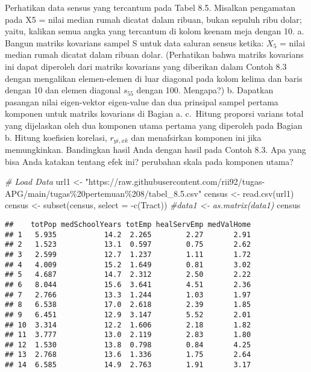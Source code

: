 \documentclass[
]{article}
\newenvironment{Shaded}{\begin{snugshade}}{\end{snugshade}}
\newcommand{\AttributeTok}[1]{\textcolor[rgb]{0.77,0.63,0.00}{#1}}
\newcommand{\CommentTok}[1]{\textcolor[rgb]{0.56,0.35,0.01}{\textit{#1}}}
\newcommand{\FunctionTok}[1]{\textcolor[rgb]{0.00,0.00,0.00}{#1}}
\newcommand{\NormalTok}[1]{#1}
\newcommand{\OtherTok}[1]{\textcolor[rgb]{0.56,0.35,0.01}{#1}}
\newcommand{\SpecialCharTok}[1]{\textcolor[rgb]{0.00,0.00,0.00}{#1}}
\newcommand{\StringTok}[1]{\textcolor[rgb]{0.31,0.60,0.02}{#1}}
\begin{document}
Perhatikan data sensus yang tercantum pada Tabel 8.5. Misalkan
pengamatan pada X5 = nilai median rumah dicatat dalam ribuan, bukan
sepuluh ribu dolar; yaitu, kalikan semua angka yang tercantum di kolom
keenam meja dengan 10. a. Bangun matriks kovarians sampel S untuk data
saluran sensus ketika: \(X_{5}\) = nilai median rumah dicatat dalam
ribuan dolar. (Perhatikan bahwa matriks kovarians ini dapat diperoleh
dari matriks kovarians yang diberikan dalam Contoh 8.3 dengan mengalikan
elemen-elemen di luar diagonal pada kolom kelima dan baris dengan 10 dan
elemen diagonal \(s_{55}\) dengan 100. Mengapa?) b. Dapatkan pasangan
nilai eigen-vektor eigen-value dan dua prinsipal sampel pertama komponen
untuk matriks kovarians di Bagian a. c.~Hitung proporsi varians total
yang dijelaskan oleh dua komponen utama pertama yang diperoleh pada
Bagian b. Hitung koefisien korelasi, \(r_{yi, xk}\) dan menafsirkan
komponen ini jika memungkinkan. Bandingkan hasil Anda dengan hasil pada
Contoh 8.3. Apa yang bisa Anda katakan tentang efek ini? perubahan skala
pada komponen utama?

\begin{Shaded}
\begin{Highlighting}[]
\CommentTok{\# Load Data}
\NormalTok{url1 }\OtherTok{\textless{}{-}} \StringTok{"https://raw.githubusercontent.com/rii92/tugas{-}APG/main/tugas\%20pertemuan\%208/tabel\_8.5.csv"}
\NormalTok{census }\OtherTok{\textless{}{-}} \FunctionTok{read.csv}\NormalTok{(url1)}
\NormalTok{census }\OtherTok{\textless{}{-}} \FunctionTok{subset}\NormalTok{(census, }\AttributeTok{select =} \SpecialCharTok{{-}}\FunctionTok{c}\NormalTok{(Tract))}
\CommentTok{\#data1 \textless{}{-} as.matrix(data1)}
\NormalTok{census}
\end{Highlighting}
\end{Shaded}

\begin{verbatim}
##    totPop medSchoolYears totEmp healServEmp medValHome
## 1   5.935           14.2  2.265        2.27       2.91
## 2   1.523           13.1  0.597        0.75       2.62
## 3   2.599           12.7  1.237        1.11       1.72
## 4   4.009           15.2  1.649        0.81       3.02
## 5   4.687           14.7  2.312        2.50       2.22
## 6   8.044           15.6  3.641        4.51       2.36
## 7   2.766           13.3  1.244        1.03       1.97
## 8   6.538           17.0  2.618        2.39       1.85
## 9   6.451           12.9  3.147        5.52       2.01
## 10  3.314           12.2  1.606        2.18       1.82
## 11  3.777           13.0  2.119        2.83       1.80
## 12  1.530           13.8  0.798        0.84       4.25
## 13  2.768           13.6  1.336        1.75       2.64
## 14  6.585           14.9  2.763        1.91       3.17
\end{verbatim}
\end{document}

